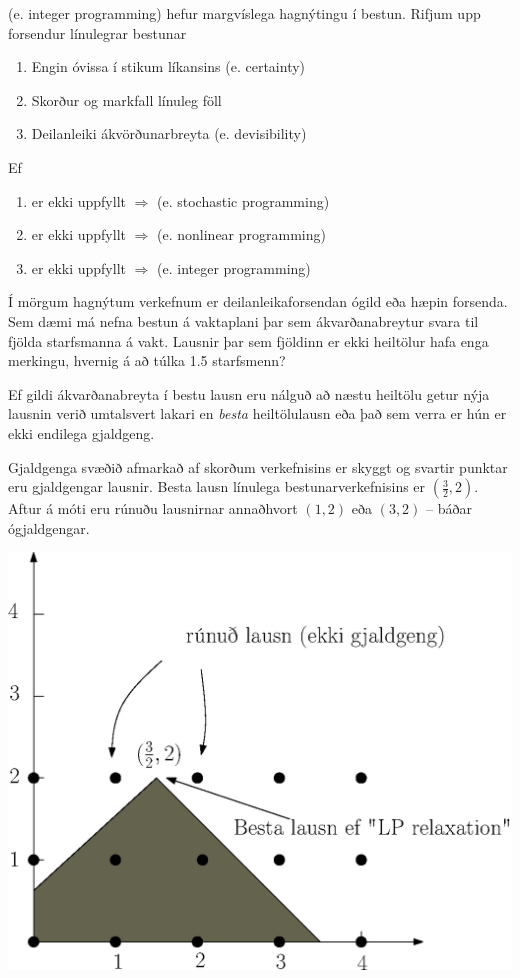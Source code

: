  (e. integer programming) hefur margvíslega hagnýtingu í bestun.
Rifjum upp forsendur línulegrar bestunar 
\begin{enumerate}
  \item Engin óvissa í stikum líkansins (e. certainty)
  \item Skorður og markfall línuleg föll
  \item Deilanleiki ákvörðunarbreyta (e. devisibility) 
\end{enumerate}
Ef
\begin{enumerate}
  \item er ekki uppfyllt $\Rightarrow$  (e. stochastic programming)
  \item er ekki uppfyllt $\Rightarrow$  (e. nonlinear programming)
  \item er ekki uppfyllt $\Rightarrow$  (e. integer programming)
\end{enumerate}

Í mörgum hagnýtum verkefnum er deilanleikaforsendan ógild eða hæpin forsenda. Sem dæmi má nefna bestun á vaktaplani þar sem ákvarðanabreytur svara til fjölda starfsmanna á vakt. Lausnir þar sem fjöldinn er ekki heiltölur hafa enga merkingu, hvernig á að túlka 1.5 starfsmenn?

Ef gildi ákvarðanabreyta í bestu lausn eru nálguð að næstu heiltölu getur nýja lausnin verið umtalsvert lakari en \emph{besta} heiltölulausn eða það sem verra er hún er ekki endilega gjaldgeng.

\begin{samepage}
\begin{daemi}\label{daemi:ip:myndr}Gjaldgenga svæðið afmarkað af skorðum verkefnisins er skyggt og svartir punktar eru gjaldgengar lausnir. Besta lausn línulega bestunarverkefnisins er $(\frac{3}{2},2)$. Aftur á móti eru rúnuðu lausnirnar annaðhvort $(1,2)$ eða $(3,2)$ -- báðar ógjaldgengar. 
\begin{center}
  \includegraphics[width=0.7\columnwidth]{figs/relaxation.eps}
\end{center}
\end{daemi}
\end{samepage}

